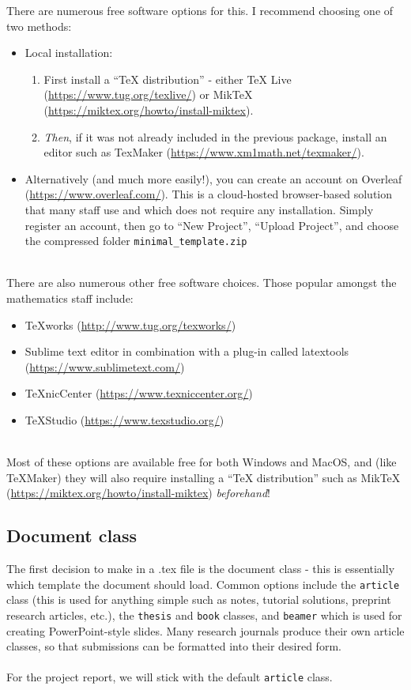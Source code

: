 \documentclass[12pt,fleqn]{article}
\theoremstyle{plain}
\begin{document}
	There are numerous free software options for this. I recommend choosing one of two methods:
	\begin{itemize}
		\item Local installation:
			\begin{enumerate}
				\item First install a ``TeX distribution'' - either TeX Live (\url{https://www.tug.org/texlive/}) or MikTeX (\url{https://miktex.org/howto/install-miktex}).
				\item  \emph{Then}, if it was not already included in the previous package, install an editor such as TexMaker (\url{https://www.xm1math.net/texmaker/}).
			\end{enumerate}
		\item Alternatively (and much more easily!), you can create an account on Overleaf (\url{https://www.overleaf.com/}). This is a cloud-hosted browser-based solution that many staff use and which does not require any installation. Simply register an account, then go to ``New Project'', ``Upload Project'', and choose the compressed folder \verb!minimal_template.zip!
	\end{itemize}
	~\\
	There are also numerous other free software choices. Those popular amongst the mathematics staff include:
	\begin{itemize}
		\item TeXworks (\url{http://www.tug.org/texworks/})
		\item Sublime text editor in combination with a plug-in called latextools (\url{https://www.sublimetext.com/})
		\item TeXnicCenter (\url{https://www.texniccenter.org/})
		\item TeXStudio (\url{https://www.texstudio.org/})
	\end{itemize}
	~\\
	Most of these options are available free for both Windows and MacOS, and (like TeXMaker) they will also require installing a ``TeX distribution'' such as MikTeX (\url{https://miktex.org/howto/install-miktex}) \emph{beforehand}!
	
	\subsection{Document class}
	The first decision to make in a .tex file is the document class - this is essentially which template the document should load. Common options include the \verb!article! class (this is used for anything simple such as notes, tutorial solutions, preprint research articles, etc.), the \verb!thesis! and \verb!book! classes, and \verb!beamer! which is used for creating PowerPoint-style slides. Many research journals produce their own article classes, so that submissions can be formatted into their desired form.\\
	\\
	For the project report, we will stick with the default \verb!article! class.
	
\end{document}
